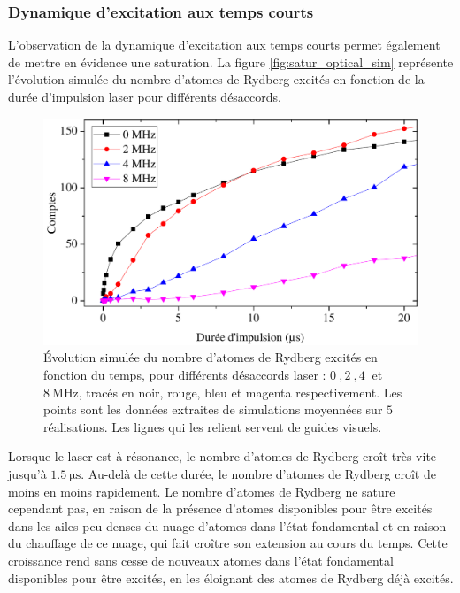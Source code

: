\subsubsection*{Dynamique d'excitation aux temps courts}
\noindent L'observation de la dynamique d'excitation aux temps courts permet également de mettre en évidence une saturation.
La figure \eqref{fig:satur_optical_sim} représente l'évolution simulée du nombre  d'atomes de Rydberg excités en fonction de la durée d'impulsion laser pour différents désaccords.%
%
\begin{figure}[h]
\centering
\includegraphics[width=\linewidth]{figures/low_l/satur_optical_sim}
\caption[\'Evolution simulée du nombre d'atomes de Rydberg excités en fonction du temps pour différents désaccords laser]{
\'Evolution simulée du nombre d'atomes de Rydberg excités en fonction du temps, pour différents désaccords laser : $\SI{0}{},\SI{2}{},\SI{4}{}$ et $\SI{8}{\MHz}$, tracés en noir, rouge, bleu et magenta respectivement.
Les points sont les données extraites de simulations moyennées sur $\SI{5}{}$ réalisations. Les lignes qui les relient servent de guides visuels.
}
\label{fig:satur_optical_sim}
\end{figure}
%

Lorsque le laser est à résonance, le nombre d'atomes de Rydberg croît très vite jusqu'à $\SI{1.5}{\us}$.
Au-delà de cette durée, le nombre d'atomes de Rydberg croît de moins en moins rapidement.
Le nombre d'atomes de Rydberg ne sature cependant pas, en raison de la présence d'atomes disponibles pour être excités dans les ailes peu denses du nuage d'atomes dans l'état fondamental et en raison du chauffage de ce nuage, qui fait croître son extension au cours du temps.
Cette croissance rend sans cesse de nouveaux atomes dans l'état fondamental disponibles pour être excités, en les éloignant des atomes de Rydberg déjà excités.

